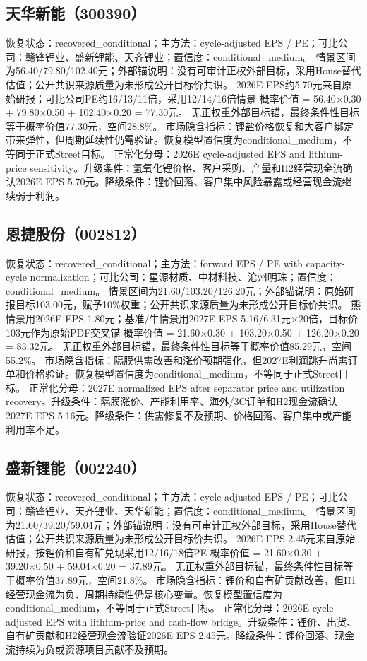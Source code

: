 \subsection{天华新能（300390）}
恢复状态：recovered\_conditional；主方法：cycle-adjusted EPS / PE；可比公司：赣锋锂业、盛新锂能、天齐锂业；置信度：conditional\_medium。
情景区间为56.40/79.80/102.40元；外部锚说明：没有可审计正权外部目标，采用House替代估值；公开共识来源质量为未形成公开目标价共识。
2026E EPS约5.70元来自原始研报；可比公司PE约16/13/11倍，采用12/14/16倍情景
概率价值 = 56.40×0.30 + 79.80×0.50 + 102.40×0.20 = 77.30元。
无正权重外部目标锚，最终条件性目标等于概率价值77.30元，空间28.8\%。
市场隐含指标：锂盐价格恢复和大客户绑定带来弹性，但周期延续性仍需验证。恢复模型置信度为conditional\_medium，不等同于正式Street目标。
正常化分母：2026E cycle-adjusted EPS and lithium-price sensitivity。升级条件：氢氧化锂价格、客户采购、产量和H2经营现金流确认2026E EPS 5.70元。降级条件：锂价回落、客户集中风险暴露或经营现金流继续弱于利润。
\subsection{恩捷股份（002812）}
恢复状态：recovered\_conditional；主方法：forward EPS / PE with capacity-cycle normalization；可比公司：星源材质、中材科技、沧州明珠；置信度：conditional\_medium。
情景区间为21.60/103.20/126.20元；外部锚说明：原始研报目标103.00元，赋予10\%权重；公开共识来源质量为未形成公开目标价共识。
熊情景用2026E EPS 1.80元；基准/牛情景用2027E EPS 5.16/6.31元×20倍，目标价103元作为原始PDF交叉锚
概率价值 = 21.60×0.30 + 103.20×0.50 + 126.20×0.20 = 83.32元。
无正权重外部目标锚，最终条件性目标等于概率价值85.29元，空间55.2\%。
市场隐含指标：隔膜供需改善和涨价预期强化，但2027E利润跳升尚需订单和价格验证。恢复模型置信度为conditional\_medium，不等同于正式Street目标。
正常化分母：2027E normalized EPS after separator price and utilization recovery。升级条件：隔膜涨价、产能利用率、海外/3C订单和H2现金流确认2027E EPS 5.16元。降级条件：供需修复不及预期、价格回落、客户集中或产能利用率不足。
\subsection{盛新锂能（002240）}
恢复状态：recovered\_conditional；主方法：cycle-adjusted EPS / PE；可比公司：赣锋锂业、天齐锂业、天华新能；置信度：conditional\_medium。
情景区间为21.60/39.20/59.04元；外部锚说明：没有可审计正权外部目标，采用House替代估值；公开共识来源质量为未形成公开目标价共识。
2026E EPS 2.45元来自原始研报，按锂价和自有矿兑现采用12/16/18倍PE
概率价值 = 21.60×0.30 + 39.20×0.50 + 59.04×0.20 = 37.89元。
无正权重外部目标锚，最终条件性目标等于概率价值37.89元，空间21.8\%。
市场隐含指标：锂价和自有矿贡献改善，但H1经营现金流为负、周期持续性仍是核心变量。恢复模型置信度为conditional\_medium，不等同于正式Street目标。
正常化分母：2026E cycle-adjusted EPS with lithium-price and cash-flow bridge。升级条件：锂价、出货、自有矿贡献和H2经营现金流验证2026E EPS 2.45元。降级条件：锂价回落、现金流持续为负或资源项目贡献不及预期。
